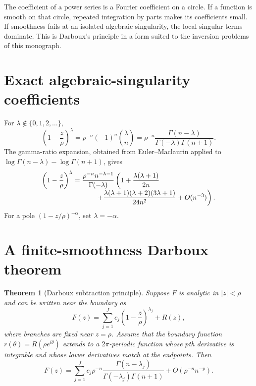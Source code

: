 \documentclass[11pt,a4paper,oneside,openany]{book}
\newtheorem{theorem}{Theorem}[chapter]
\theoremstyle{definition}
\theoremstyle{remark}
\begin{document}
The coefficient of a power series is a Fourier coefficient on a circle.  If a
function is smooth on that circle, repeated integration by parts makes its
coefficients small.  If smoothness fails at an isolated algebraic singularity,
the local singular terms dominate.  This is Darboux's principle in a form
suited to the inversion problems of this monograph.

\section{Exact algebraic-singularity coefficients}

For $\lambda\notin\{0,1,2,\ldots\}$,
\begin{equation}
 [z^n]\left(1-\frac z\rho\right)^{\lambda}
 =\rho^{-n}(-1)^n\binom\lambda n
 =\rho^{-n}\frac{\Gamma(n-\lambda)}
  {\Gamma(-\lambda)\Gamma(n+1)}.
 \label{new:eq:algebraic-coefficient}
\end{equation}
The gamma-ratio expansion, obtained from Euler--Maclaurin applied to
$\log\Gamma(n-\lambda)-\log\Gamma(n+1)$, gives
\begin{align}
 [z^n]\left(1-\frac z\rho\right)^{\lambda}
 ={}&\frac{\rho^{-n}n^{-\lambda-1}}{\Gamma(-\lambda)}
 \left(1+\frac{\lambda(\lambda+1)}{2n}\right.
 \notag\\[-1mm]
 &\left.\qquad
 +\frac{\lambda(\lambda+1)(\lambda+2)(3\lambda+1)}{24n^2}
 +O(n^{-3})\right).
 \label{new:eq:algebraic-coefficient-asymptotic}
\end{align}
For a pole $(1-z/\rho)^{-\alpha}$, set $\lambda=-\alpha$.

\section{A finite-smoothness Darboux theorem}

\begin{theorem}[Darboux subtraction principle]
Suppose $F$ is analytic in $|z|<\rho$ and can be written near the boundary as
\begin{equation}
 F(z)=\sum_{j=1}^Jc_j\left(1-\frac z\rho\right)^{\lambda_j}+R(z),
 \label{new:eq:darboux-decomposition}
\end{equation}
where branches are fixed near $z=\rho$.  Assume that the boundary function
$r(\theta)=R(\rho e^{i\theta})$ extends to a $2\pi$-periodic function whose
$p$th derivative is integrable and whose lower derivatives match at the
endpoints.  Then
\begin{equation}
 [z^n]F(z)
 =\sum_{j=1}^Jc_j\rho^{-n}
   \frac{\Gamma(n-\lambda_j)}
        {\Gamma(-\lambda_j)\Gamma(n+1)}
 +O(\rho^{-n}n^{-p}).
 \label{new:eq:darboux-theorem}
\end{equation}
\end{theorem}
\end{document}
